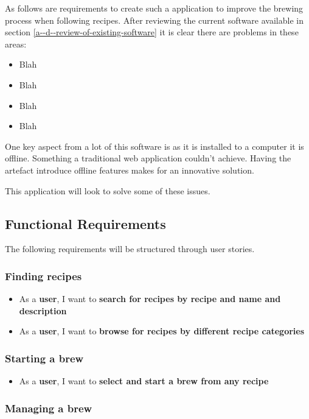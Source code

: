 As follows are requirements to create such a application to improve the brewing process when following recipes. After reviewing the current software available in section \ref{a--d--review-of-existing-software} it is clear there are problems in these areas:

\begin{itemize}
  \item Blah
  \item Blah
  \item Blah
  \item Blah
\end{itemize}

One key aspect from a lot of this software is as it is installed to a computer it is offline. Something a traditional web application couldn't achieve. Having the artefact introduce offline features makes for an innovative solution.

This application will look to solve some of these issues.

\subsection{Functional Requirements} \label{a-d--requirements--functional}

The following requirements will be structured through user stories. %

\subsubsection{Finding recipes}

\begin{itemize}
  \item As a \textbf{user}, I want to \textbf{search for recipes by recipe and name and description}
  \item As a \textbf{user}, I want to \textbf{browse for recipes by different recipe categories}
\end{itemize}

\subsubsection{Starting a brew}

\begin{itemize}
  \item As a \textbf{user}, I want to \textbf{select and start a brew from any recipe}
\end{itemize}

\subsubsection{Managing a brew}

